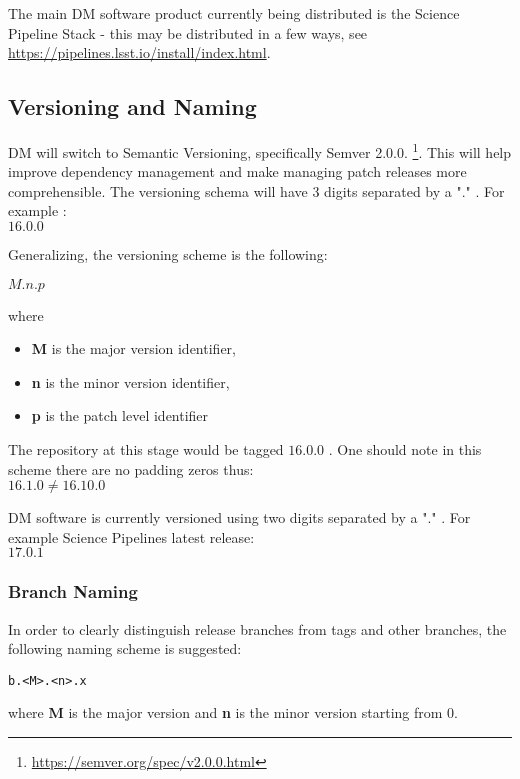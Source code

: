 The main DM software product currently being distributed is the Science Pipeline Stack -
this may be distributed in a few ways, see \url{https://pipelines.lsst.io/install/index.html}.


\subsection{Versioning and Naming} \label{sec:versioning}

DM will  switch to Semantic Versioning, specifically Semver 2.0.0. \footnote{\url{https://semver.org/spec/v2.0.0.html}}.
This will help improve dependency management and make managing patch releases more comprehensible.
The versioning schema will have 3 digits separated by a "." . For example :
\\
$16.0.0$

Generalizing, the versioning scheme is the following:

$M.n.p$

where

\begin{itemize}
\item \textbf{M} is the major version identifier,
\item \textbf{n} is the minor version identifier,
\item \textbf{p} is the patch level identifier
\end{itemize}

The repository at this stage would be tagged $16.0.0$ .
One should note in this scheme there are no padding zeros thus:
\\
$16.1.0   \neq 16.10.0$

DM software is currently versioned using two digits separated by a "." .
For example Science Pipelines latest release:\\
$17.0.1$


\subsubsection{Branch Naming} \label{sec:branchnaming}

In order to clearly distinguish release branches from tags and other branches, the following naming scheme is suggested:

\begin{verbatim}
b.<M>.<n>.x
\end{verbatim}

where \textbf{M} is the major version and \textbf{n} is the minor version starting from 0.


